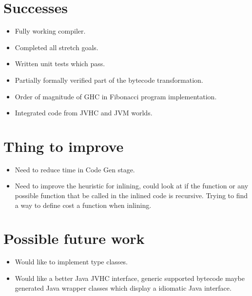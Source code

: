 \documentclass[float=false, crop=false]{standalone}
\begin{document}
\section{Successes}

\begin{itemize}
  \item Fully working compiler.

  \item Completed all stretch goals.

  \item Written unit tests which pass.

  \item Partially formally verified part of the bytecode transformation.

  \item Order of magnitude of GHC in Fibonacci program implementation.

  \item Integrated code from JVHC and JVM worlds.

\end{itemize}

\section{Thing to improve}

\begin{itemize}
  \item Need to reduce time in Code Gen stage.

  \item Need to improve the heuristic for inlining, could look at if the function
    or any possible function that be called in the inlined code is
    recursive. Trying to find a way to define cost a function when inlining.
\end{itemize}

\section{Possible future work}
\begin{itemize}
  \item Would like to implement type classes.

  \item Would like a better Java JVHC interface, generic supported bytecode
    maybe generated Java wrapper classes which display a idiomatic Java 
    interface.
\end{itemize}
\end{document}
